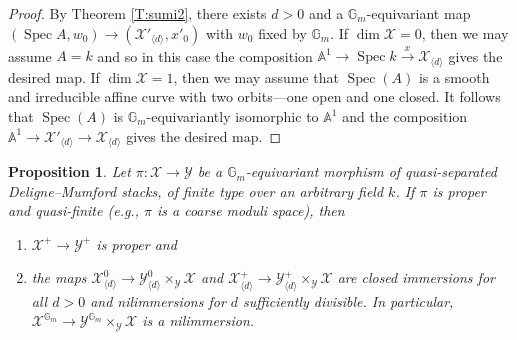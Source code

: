 \documentclass[a4paper]{amsart}
\theoremstyle{plain}
\newtheorem{proposition}[theorem]{Proposition}
\theoremstyle{definition}
\theoremstyle{remark}
\numberwithin{equation}{section}
\newcommand{\GG}{\mathbb{G}}
\renewcommand\AA{\mathbb{A}}
\newcommand\cX{\mathcal{X}}
\newcommand\cY{\mathcal{Y}}
\newcommand\co{\colon}
\DeclareMathOperator{\Spec}{Spec}
\begin{document}
\begin{proof}
 By Theorem \ref{T:sumi2}, there exists $d > 0$ and a $\GG_m$-equivariant map $(\Spec A,w_0) \to (\cX'_{\langle d \rangle}, x'_0)$ with $w_0$ fixed by $\GG_m$.  If $\dim \cX = 0$, then we may assume $A=k$ and so in this case the composition $\AA^1 \to \Spec k \xrightarrow{x} \cX_{\langle d \rangle}$ gives the desired map.  If $\dim \cX = 1$, then we may assume that $\Spec(A)$ is a smooth and irreducible affine curve with two orbits---one open and one closed.  It follows that $\Spec(A)$ is $\GG_m$-equivariantly isomorphic to $\AA^1$ and the composition $\AA^1 \to \cX'_{\langle d \rangle} \to \cX_{\langle d \rangle}$ gives the desired map.
\end{proof}


\begin{proposition} \label{P:cms}
Let $\pi \co \cX \to \cY$ be a $\GG_m$-equivariant morphism
of quasi-separated 
Deligne--Mumford stacks, 
of finite type over an arbitrary field $k$.  If $\pi$ is proper and quasi-finite (e.g., $\pi$ is a coarse moduli space), then
\begin{enumerate}
	\item \label{P:cms-proper}
          $\cX^+ \to \cY^+$ is proper and
        \item \label{P:cms-climmersion-nilimmersion-both} 
          the maps $\cX^0_{\langle d \rangle} \to \cY^0_{\langle d \rangle} \times_{\cY} \cX$ and $\cX^+_{\langle d\rangle} \to \cY^+_{\langle d \rangle} \times_{\cY} \cX$ are closed immersions for all $d>0$ and nilimmersions for $d$ sufficiently divisible. In particular, $\cX^{\GG_m} \to \cY^{\GG_m} \times_{\cY} \cX$ is a nilimmersion.
\end{enumerate}
\end{proposition}
\end{document}
